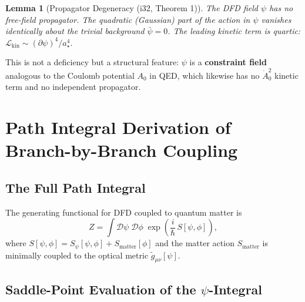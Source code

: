 \documentclass[11pt,a4paper]{article}
\newtheorem{lemma}[theorem]{Lemma}
\begin{document}
\begin{lemma}[Propagator Degeneracy (i32, Theorem 1)]
\label{lem:no-propagator}
The DFD field $\psi$ has no free-field propagator. The quadratic
(Gaussian) part of the action in $\psi$ vanishes identically about the
trivial background $\bar\psi = 0$. The leading kinetic term is quartic:
$\mathcal{L}_\mathrm{kin} \sim (\partial\psi)^4/a_\star^4$.
\end{lemma}

This is not a deficiency but a structural feature: $\psi$ is a
\textbf{constraint field} analogous to the Coulomb potential $A_0$ in
QED, which likewise has no $\dot{A}_0^2$ kinetic term and no independent
propagator.

\section{Path Integral Derivation of Branch-by-Branch Coupling}
\label{sec:path-integral}

\subsection{The Full Path Integral}

The generating functional for DFD coupled to quantum matter is
\begin{equation}\label{eq:Z-full}
Z = \int\mathcal{D}\psi\;\mathcal{D}\phi\;
\exp\!\left(\frac{i}{\hbar}\,S[\psi,\phi]\right),
\end{equation}
where $S[\psi,\phi] = S_\psi[\psi,\phi] + S_\mathrm{matter}[\phi]$ and the
matter action $S_\mathrm{matter}$ is minimally coupled to the optical metric
$\tilde{g}_{\mu\nu}[\psi]$.

\subsection{Saddle-Point Evaluation of the $\psi$-Integral}
\end{document}
